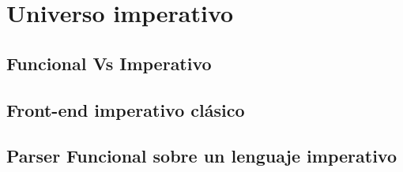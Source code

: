 
\chapter{Universo imperativo}


\section{Funcional Vs Imperativo}

\section{Front-end imperativo clásico}

\section{Parser Funcional sobre un lenguaje imperativo}


